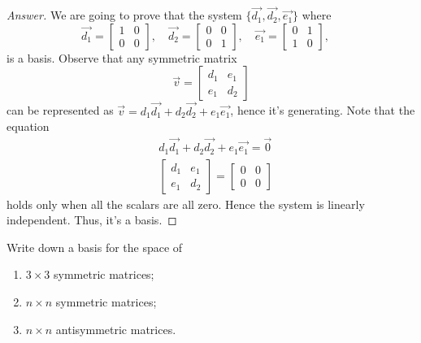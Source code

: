 \documentclass{article}
\def\by{\times}
\begin{document}
\begin{proof}[Answer]
  We are going to prove that the system $\{\vec{d_1},\vec{d_2},\vec{e_1}\}$ where
  \[
    \vec{d_1}= \begin{bmatrix} 1&0\\0&0 \end{bmatrix},\quad
    \vec{d_2}= \begin{bmatrix} 0&0\\0&1 \end{bmatrix},\quad
    \vec{e_1}= \begin{bmatrix} 0&1\\1&0 \end{bmatrix},\quad
  \]
  is a basis. Observe that any symmetric matrix 
  \[
    \vec{v}=
    \begin{bmatrix}
      d_1 & e_1\\
      e_1 & d_2
    \end{bmatrix}
  \]
  can be represented as $\vec{v}=d_1\vec{d_1}+d_2\vec{d_2}+e_1\vec{e_1}$,
  hence it's generating. Note that the equation 
  \begin{align*}
    &d_1\vec{d_1}+d_2\vec{d_2}+e_1\vec{e_1}=\vec{0}\\
    &\begin{bmatrix}d_1 & e_1\\  e_1 &d_2\end{bmatrix}=\begin{bmatrix}0&0\\0&0\end{bmatrix}
  \end{align*}
  holds only when all the scalars are all zero. Hence the system is linearly 
  independent. Thus, it's a basis.

\end{proof}
\begin{exercise}
  Write down a basis for the space of
  \begin{enumerate}
    \item $3\by 3$ symmetric matrices;
    \item $n\by n$ symmetric matrices;
    \item $n\by n$ antisymmetric matrices.
  \end{enumerate}
\end{exercise}
\end{document}
